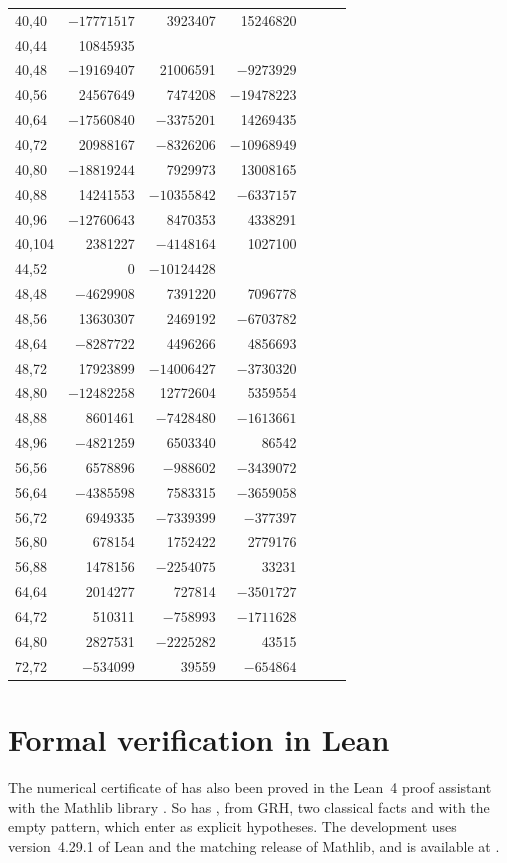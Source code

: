 \documentclass[11pt,colorlinks]{charlie}
\begin{document}
{\begin{longtable}{@{}l rrrrrr@{}}
40,40 & $-17771517$ & 3923407 & 15246820 &  &  & \\
40,44 & 10845935 &  &  &  &  & \\
40,48 & $-19169407$ & 21006591 & $-9273929$ &  &  & \\
40,56 & 24567649 & 7474208 & $-19478223$ &  &  & \\
40,64 & $-17560840$ & $-3375201$ & 14269435 &  &  & \\
40,72 & 20988167 & $-8326206$ & $-10968949$ &  &  & \\
40,80 & $-18819244$ & 7929973 & 13008165 &  &  & \\
40,88 & 14241553 & $-10355842$ & $-6337157$ &  &  & \\
40,96 & $-12760643$ & 8470353 & 4338291 &  &  & \\
40,104 & 2381227 & $-4148164$ & 1027100 &  &  & \\
44,52 & 0 & $-10124428$ &  &  &  & \\
48,48 & $-4629908$ & 7391220 & 7096778 &  &  & \\
48,56 & 13630307 & 2469192 & $-6703782$ &  &  & \\
48,64 & $-8287722$ & 4496266 & 4856693 &  &  & \\
48,72 & 17923899 & $-14006427$ & $-3730320$ &  &  & \\
48,80 & $-12482258$ & 12772604 & 5359554 &  &  & \\
48,88 & 8601461 & $-7428480$ & $-1613661$ &  &  & \\
48,96 & $-4821259$ & 6503340 & 86542 &  &  & \\
56,56 & 6578896 & $-988602$ & $-3439072$ &  &  & \\
56,64 & $-4385598$ & 7583315 & $-3659058$ &  &  & \\
56,72 & 6949335 & $-7339399$ & $-377397$ &  &  & \\
56,80 & 678154 & 1752422 & 2779176 &  &  & \\
56,88 & 1478156 & $-2254075$ & 33231 &  &  & \\
64,64 & 2014277 & 727814 & $-3501727$ &  &  & \\
64,72 & 510311 & $-758993$ & $-1711628$ &  &  & \\
64,80 & 2827531 & $-2225282$ & 43515 &  &  & \\
72,72 & $-534099$ & 39559 & $-654864$ &  &  & \\
\bottomrule\end{longtable}
}

\section{Formal verification in Lean}\label{app:lean}
The numerical certificate of  has also been proved in the Lean~4 proof assistant \cite{Lean4} with the Mathlib library \cite{Mathlib}. So has , from GRH, two classical facts and  with the empty pattern, which enter as explicit hypotheses. The development uses version~4.29.1 of Lean and the matching release of Mathlib, and is available at \coderepo.
\end{document}
